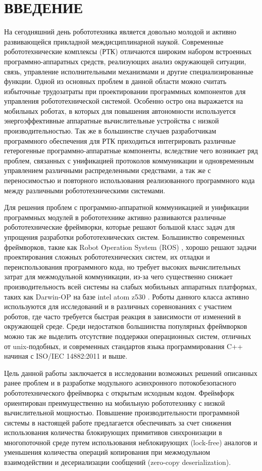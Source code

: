 \chapter*{ВВЕДЕНИЕ}

На сегодняшний день робототехника является довольно молодой и активно 
развивающейся прикладной междисциплинарной наукой. Современные 
робототехнические комплексы (РТК) отличаются широким набором встроенных 
программно-аппаратных средств, реализующих анализ окружающей ситуации, связь, 
управление исполнительными механизмами и другие специализированные функции. 
Одной из основных проблем в данной области можно считать избыточные трудозатраты при проектировании программных компонентов для управления робототехнической системой. Особенно остро она выражается на мобильных роботах, в которых для повышения автономности используется энергоэффективные аппаратные вычислительные устройства с низкой производительностью. Так же в большинстве случаев разработчикам программного обеспечения для РТК приходиться интегрировать различные гетерогенные программно-аппаратные компоненты, вследствие чего возникает ряд проблем, связанных с унификацией протоколов коммуникации и одновременным управлением различными распределенными средствами, а так же с переносимостью и повторного использования реализованного программного кода между различными робототехническими системами.

Для решения проблем с программно-аппаратной коммуникацией и унификации 
программных модулей в робототехнике активно развиваются различные 
робототехнические фреймворки, которые решают большой класс задач для упрощения разработки робототехнических систем. Большинство современных фреймворков, такие как Robot Operation System (ROS) \cite{quigley2009ros}, хорошо решают задачи проектирования сложных робототехнических систем, их отладки и переиспользования программного кода, но требует высоких вычислительных затрат для межмодульной коммуникации, из-за чего существенно снижает производительность всей системы на слабых мобильных аппаратных платформах, таких как Darwin-OP на базе intel atom z530 \cite{ha2011development}. Роботы данного класса активно используются для исследований и в различных соревнованиях с участием роботов, где часто требуется быстрая реакция в зависимости от изменений в окружающей среде. Среди недостатков большинства популярных фреймворков можно так же выделить отсутствие поддержки операционных систем, отличных от unix-подобных, и современных стандартов языка программирования C++ начиная с ISO/IEC 14882:2011 \cite{c++2011iso} и выше.

Цель данной работы заключается в исследовании возможных решений описанных ранее проблем и в разработке модульного асинхронного потокобезопасного робототехнического фреймворка с открытым исходным кодом. Фреймфорк ориентирован преимущественно на мобильную робототехнику с низкой вычислительной мощностью. Повышение производительности программной системы в настоящей работе предлагается обеспечивать за счет снижения использования количества блокирующих примитивов синхронизации в многопоточной среде путем использования неблокирующих (lock-free) аналогов и уменьшения количества операций копирования при межмодульном взаимодействии и десериализации сообщений (zero-copy deserialization).
